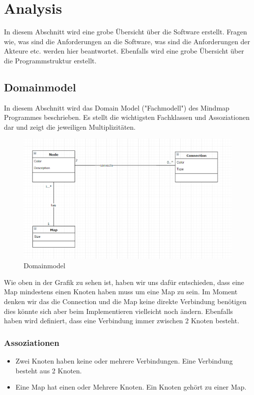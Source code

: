 \chapter{Analysis}
\label{chap:analysis}

In diesem Abschnitt wird eine grobe Übersicht über die Software erstellt. Fragen wie, was sind die Anforderungen an die Software, was sind die Anforderungen der Akteure etc. werden hier beantwortet. Ebenfalls wird eine grobe Übersicht über die Programmstruktur erstellt.

\section{Domainmodel}
\label{sec:domain_model}
In diesem Abschnitt wird das Domain Model ("{}Fachmodell"{}) des Mindmap Programmes beschrieben. Es stellt die 
wichtigsten Fachklassen und Assoziationen dar und zeigt die jeweiligen Multiplizitäten.

\begin{figure}[H]
	\centering
		\includegraphics[scale=0.7]{images/DomainModel.png}
	\caption{Domainmodel}
	\label{fig:domain_model}
\end{figure}

Wie oben in der Grafik zu sehen ist, haben wir uns dafür entschieden, dass eine Map mindestens einen Knoten haben muss um eine Map zu sein. Im Moment denken wir das die Connection und die Map keine direkte Verbindung benötigen dies könnte sich aber beim Implementieren vielleicht noch ändern. Ebenfalls haben wird definiert, dass eine Verbindung immer zwischen 2 Knoten besteht.

\subsection{Assoziationen}
\label{subsec:assoziationen}
\begin{itemize}
\item Zwei Knoten haben keine oder mehrere Verbindungen. Eine Verbindung besteht aus 2 Knoten.
\item Eine Map hat einen oder Mehrere Knoten. Ein Knoten gehört zu einer Map.
\end{itemize}

